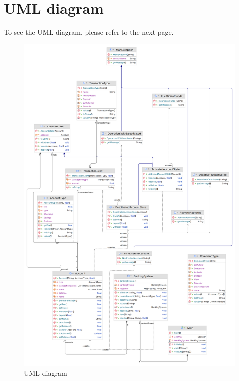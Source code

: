 \documentclass{report}
\begin{document}
\section*{UML diagram}

To see the UML diagram, please refer to the next page.

\newpage
\begin{figure}[h]
    \centering
    \includegraphics[width=\textwidth]{UML.png}
    \caption{UML diagram}
\end{figure}
\end{document}

